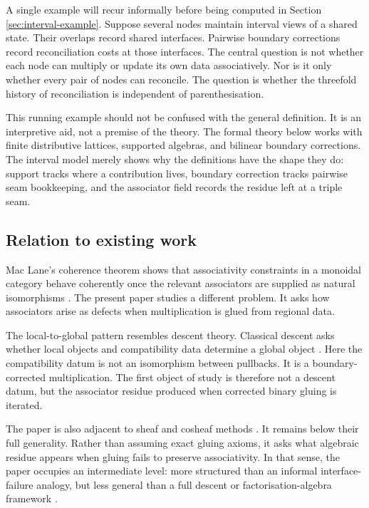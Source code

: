\documentclass[11pt]{article}
\begin{document}
A single example will recur informally before being computed in Section \ref{sec:interval-example}. Suppose several nodes maintain interval views of a shared state. Their overlaps record shared interfaces. Pairwise boundary corrections record reconciliation costs at those interfaces. The central question is not whether each node can multiply or update its own data associatively. Nor is it only whether every pair of nodes can reconcile. The question is whether the threefold history of reconciliation is independent of parenthesisation.

This running example should not be confused with the general definition. It is an interpretive aid, not a premise of the theory. The formal theory below works with finite distributive lattices, supported algebras, and bilinear boundary corrections. The interval model merely shows why the definitions have the shape they do: support tracks where a contribution lives, boundary correction tracks pairwise seam bookkeeping, and the associator field records the residue left at a triple seam.

\subsection{Relation to existing work}

Mac Lane's coherence theorem shows that associativity constraints in a monoidal category behave coherently once the relevant associators are supplied as natural isomorphisms \cite{MacLane1963,MacLane1998}. The present paper studies a different problem. It asks how associators arise as defects when multiplication is glued from regional data.

The local-to-global pattern resembles descent theory. Classical descent asks whether local objects and compatibility data determine a global object \cite{Giraud1971,Weibel1994}. Here the compatibility datum is not an isomorphism between pullbacks. It is a boundary-corrected multiplication. The first object of study is therefore not a descent datum, but the associator residue produced when corrected binary gluing is iterated.

The paper is also adjacent to sheaf and cosheaf methods \cite{KashiwaraSchapira1990}. It remains below their full generality. Rather than assuming exact gluing axioms, it asks what algebraic residue appears when gluing fails to preserve associativity. In that sense, the paper occupies an intermediate level: more structured than an informal interface-failure analogy, but less general than a full descent or factorisation-algebra framework \cite{CostelloGwilliam2017}.
\end{document}
